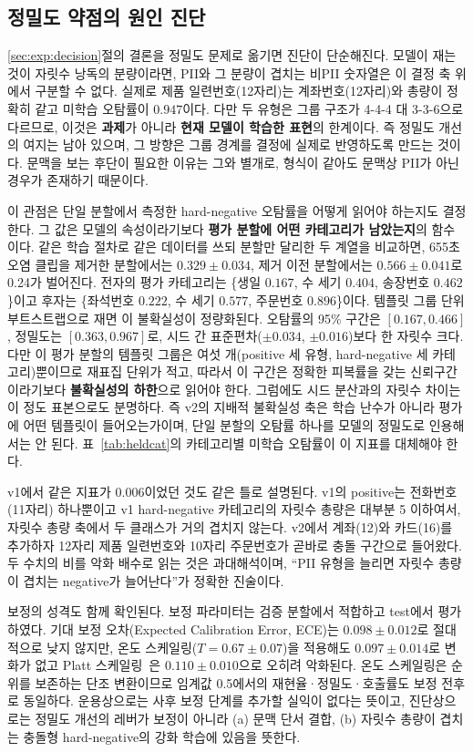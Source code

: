\documentclass[11pt]{article}
\renewcommand{\emph}[1]{\textbf{#1}}
\begin{document}
\subsection{정밀도 약점의 원인 진단}
\ref{sec:exp:decision}절의 결론을 정밀도 문제로 옮기면 진단이 단순해진다. 모델이 재는 것이
자릿수 낭독의 분량이라면, PII와 그 분량이 겹치는 비PII 숫자열은 이 결정 축 위에서 구분할 수
없다. 실제로 제품 일련번호(12자리)는 계좌번호(12자리)와 총량이 정확히 같고 미학습 오탐률이
$0.947$이다. 다만 두 유형은 그룹 구조가 4-4-4 대 3-3-6으로 다르므로, 이것은 \emph{과제}가
아니라 \emph{현재 모델이 학습한 표현}의 한계이다. 즉 정밀도 개선의 여지는 남아 있으며, 그
방향은 그룹 경계를 결정에 실제로 반영하도록 만드는 것이다. 문맥을 보는 후단이 필요한 이유는
그와 별개로, 형식이 같아도 문맥상 PII가 아닌 경우가 존재하기 때문이다.

이 관점은 단일 분할에서 측정한 hard-negative 오탐률을 어떻게 읽어야 하는지도 결정한다. 그
값은 모델의 속성이라기보다 \emph{평가 분할에 어떤 카테고리가 남았는지}의 함수이다. 같은
학습 절차로 같은 데이터를 쓰되 분할만 달리한 두 계열을 비교하면, 655초 오염 클립을 제거한
분할에서는 $0.329\pm0.034$, 제거 이전 분할에서는 $0.566\pm0.041$로 0.24가 벌어진다. 전자의
평가 카테고리는 \{생일 $0.167$, 수 세기 $0.404$, 송장번호 $0.462$\}이고 후자는 \{좌석번호
$0.222$, 수 세기 $0.577$, 주문번호 $0.896$\}이다. 템플릿 그룹 단위 부트스트랩으로 재면 이
불확실성이 정량화된다. 오탐률의 95\% 구간은 $[0.167, 0.466]$, 정밀도는 $[0.363, 0.967]$로,
시드 간 표준편차($\pm0.034$, $\pm0.016$)보다 한 자릿수 크다. 다만 이 평가 분할의 템플릿
그룹은 여섯 개(positive 세 유형, hard-negative 세 카테고리)뿐이므로 재표집 단위가 적고,
따라서 이 구간은 정확한 피복률을 갖는 신뢰구간이라기보다 \emph{불확실성의 하한}으로 읽어야
한다. 그럼에도 시드 분산과의 자릿수 차이는 이 정도 표본으로도 분명하다. 즉 v2의 지배적 불확실성 축은
학습 난수가 아니라 평가에 어떤 템플릿이 들어오는가이며, 단일 분할의 오탐률 하나를 모델의
정밀도로 인용해서는 안 된다. 표~\ref{tab:heldcat}의 카테고리별 미학습 오탐률이 이 지표를
대체해야 한다.

v1에서 같은 지표가 $0.006$이었던 것도 같은 틀로 설명된다. v1의 positive는 전화번호(11자리)
하나뿐이고 v1 hard-negative 카테고리의 자릿수 총량은 대부분 5 이하여서, 자릿수 총량 축에서
두 클래스가 거의 겹치지 않는다. v2에서 계좌(12)와 카드(16)를 추가하자 12자리 제품 일련번호와
10자리 주문번호가 곧바로 충돌 구간으로 들어왔다. 두 수치의 비를 악화 배수로 읽는 것은
과대해석이며, ``PII 유형을 늘리면 자릿수 총량이 겹치는 negative가 늘어난다''가 정확한 진술이다.

보정의 성격도 함께 확인된다. 보정 파라미터는 검증 분할에서 적합하고 test에서 평가하였다.
기대 보정 오차(Expected Calibration Error, ECE)는 $0.098\pm0.012$로 절대적으로 낮지 않지만,
온도 스케일링($T=0.67\pm0.07$)을 적용해도 $0.097\pm0.014$로 변화가 없고 Platt
스케일링~\cite{guo2017calibration}은 $0.110\pm0.010$으로 오히려 악화된다. 온도 스케일링은
순위를 보존하는 단조 변환이므로 임계값 0.5에서의 재현율·정밀도·호출률도 보정 전후로 동일하다.
운용상으로는 사후 보정 단계를 추가할 실익이 없다는 뜻이고, 진단상으로는 정밀도 개선의 레버가
보정이 아니라 (a) 문맥 단서 결합, (b) 자릿수 총량이 겹치는 충돌형 hard-negative의 강화
학습에 있음을 뜻한다.
\end{document}
